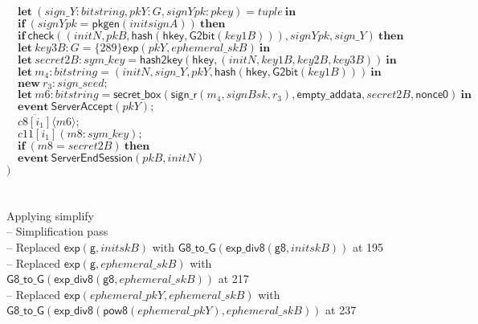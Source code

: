 \documentclass{article}
\newcommand{\cinput}[2]{{#1}({#2})}
\newcommand{\coutput}[2]{\overline{#1}\langle{#2}\rangle}
\newcommand{\kw}[1]{\mathbf{#1}}
\newcommand{\kwf}[1]{\mathsf{#1}}
\newcommand{\var}[1]{\mathit{#1}}
\newcommand{\kwt}[1]{\mathit{#1}}
\newcommand{\kwc}[1]{\mathit{#1}}
\begin{document}
\begin{tabbing}
\>$\quad \kw{let}\ \kwf{}(\var{sign{\_}Y}: \kwt{bitstring}, \var{pkY}: \kwt{G}, \var{signYpk}: \kwt{pkey}) = \var{tuple}\ \kw{in}$\\
\>$\quad \kw{if}\ (\var{signYpk}  =  \kwf{pkgen}(\var{initsignA}))\ \kw{then}$\\
\>$\quad \kw{if}\ \kwf{check}(\kwf{}(\var{initN}, \var{pkB}, \kwf{hash}(\kwf{hkey}, \kwf{G2bit}(\var{key1B}))), \var{signYpk}, \var{sign{\_}Y})\ \kw{then}$\\
\>$\quad \kw{let}\ \var{key3B}: \kwt{G} = \{289\}\kwf{exp}(\var{pkY}, \var{ephemeral{\_}skB})\ \kw{in}$\\
\>$\quad \kw{let}\ \var{secret2B}: \kwt{sym{\_}key} = \kwf{hash2key}(\kwf{hkey}, \kwf{}(\var{initN}, \var{key1B}, \var{key2B}, \var{key3B}))\ \kw{in}$\\
\>$\quad \kw{let}\ \var{m}_{4}: \kwt{bitstring} = \kwf{}(\var{initN}, \var{sign{\_}Y}, \var{pkY}, \kwf{hash}(\kwf{hkey}, \kwf{G2bit}(\var{key1B})))\ \kw{in}$\\
\>$\quad \kw{new}\ \var{r}_{3}: \kwt{sign{\_}seed};$\\
\>$\quad \kw{let}\ \var{m6}: \kwt{bitstring} = \kwf{secret{\_}box}(\kwf{sign{\_}r}(\var{m}_{4}, \var{signBsk}, \var{r}_{3}), \kwf{empty{\_}addata}, \var{secret2B}, \kwf{nonce0})\ \kw{in}$\\
\>$\quad \kw{event}\ \kwf{ServerAccept}(\var{pkY});$\\
\>$\quad \coutput{\kwc{c8}[\var{i}_{1}]}{\var{m6}};$\\
\>$\quad \cinput{\kwc{c11}[\var{i}_{1}]}{\var{m8}: \kwt{sym{\_}key}};$\\
\>$\quad \kw{if}\ (\var{m8}  =  \var{secret2B})\ \kw{then}$\\
\>$\quad \kw{event}\ \kwf{ServerEndSession}(\var{pkB}, \var{initN})$\\
\>$)$\\
\\
\\
Applying simplify\\
\quad -- Simplification pass\\
\qquad -- Replaced $\kwf{exp}(\kwf{g}, \var{initskB})$ with $\kwf{G8{\_}to{\_}G}(\kwf{exp{\_}div8}(\kwf{g8}, \var{initskB}))$ at 195\\
\qquad -- Replaced $\kwf{exp}(\kwf{g}, \var{ephemeral{\_}skB})$ with $\kwf{G8{\_}to{\_}G}(\kwf{exp{\_}div8}(\kwf{g8}, \var{ephemeral{\_}skB}))$ at 217\\
\qquad -- Replaced $\kwf{exp}(\var{ephemeral{\_}pkY}, \var{ephemeral{\_}skB})$ with $\kwf{G8{\_}to{\_}G}(\kwf{exp{\_}div8}(\kwf{pow8}(\var{ephemeral{\_}pkY}), \var{ephemeral{\_}skB}))$ at 237\\

\end{tabbing}
\end{document}
